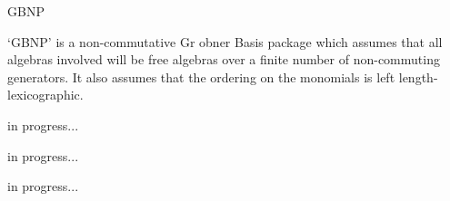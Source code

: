 %
%
%



\>GBNP

`GBNP' is a non-commutative Gr obner Basis package which assumes that 
all algebras involved will be free algebras over a finite number of
non-commuting generators.  It also assumes that the ordering on the
monomials is left length-lexicographic.


in progress...


in progress...


in progress...
